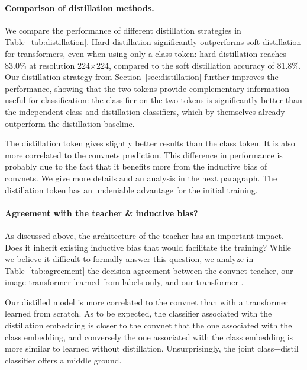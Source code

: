 \paragraph{Comparison of distillation methods.} 

We compare the performance of different distillation strategies in Table~\ref{tab:distillation}. 
Hard distillation significantly outperforms soft distillation for transformers, even when using only a class token: hard distillation reaches 83.0\% at resolution 224$\times$224, compared to the soft distillation accuracy of 81.8\%.
%
Our distillation strategy from Section~\ref{sec:distillation} further improves the performance, showing that the two tokens provide complementary information useful for classification: the classifier %
on the two tokens is significantly better than the independent class and distillation classifiers, which by themselves already outperform the distillation baseline. 

The distillation token gives slightly better results than the class token. 
It is also more correlated to the convnets prediction. This difference in performance is probably due to the fact that it benefits more from the inductive bias of convnets.
We give more details and an analysis in the next paragraph.
The distillation token has an undeniable advantage for the  initial training. 

\paragraph{Agreement with the teacher \& inductive bias?}
As discussed above, the architecture of the teacher has an important impact.  Does it inherit existing inductive bias that would facilitate the training?  %
While we believe it difficult to formally answer this question, we analyze in  
Table~\ref{tab:agreement} the decision agreement between the convnet teacher, our image transformer \ours learned from labels only, and our transformer \oursdis. 

Our distilled model is more correlated to the convnet than with a transformer learned from scratch. As to be expected, the classifier associated with the distillation embedding is closer to the convnet that the one associated with the class embedding, and conversely the one associated with the class embedding is more similar to \ours learned without distillation. Unsurprisingly, the joint class+distil classifier offers a middle ground.  
%

